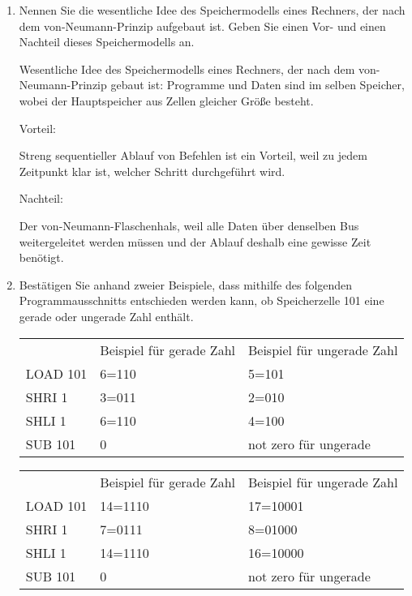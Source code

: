 \documentclass{lehramt-informatik-aufgabe}
\begin{document}
\begin{enumerate}

\item Nennen Sie die wesentliche Idee des Speichermodells eines
Rechners, der nach dem von-Neumann-Prinzip aufgebaut ist. Geben Sie
einen Vor- und einen Nachteil dieses Speichermodells an.

\begin{liAntwort}
Wesentliche Idee des Speichermodells eines Rechners, der nach dem
von-Neumann-Prinzip gebaut ist: Programme und Daten sind im selben
Speicher, wobei der Hauptspeicher aus Zellen gleicher Größe besteht.

Vorteil:

Streng sequentieller Ablauf von Befehlen ist ein Vorteil, weil zu jedem
Zeitpunkt klar ist, welcher Schritt durchgeführt wird.

Nachteil:

Der von-Neumann-Flaschenhals, weil alle Daten über denselben Bus
weitergeleitet werden müssen und der Ablauf deshalb eine gewisse Zeit
benötigt.
\end{liAntwort}


\item Bestätigen Sie anhand zweier Beispiele, dass mithilfe des
folgenden Programmausschnitts entschieden werden kann, ob
Speicherzelle 101 eine gerade oder ungerade Zahl enthält.

\begin{tabular}{lll}
         & Beispiel für gerade    Zahl & Beispiel für ungerade    Zahl \\
LOAD 101 & 6=110                       & 5=101                         \\
SHRI 1   & 3=011                       & 2=010                         \\
SHLI 1   & 6=110                       & 4=100                         \\
SUB 101  & 0                           & not zero    für ungerade
\end{tabular}

\begin{tabular}{lll}
         & Beispiel für gerade    Zahl & Beispiel für ungerade    Zahl \\
LOAD 101 & 14=1110                     & 17=10001                      \\
SHRI 1   & 7=0111                      & 8=01000                       \\
SHLI 1   & 14=1110                     & 16=10000                      \\
SUB 101  & 0                           & not zero    für ungerade
\end{tabular}


\end{enumerate}
\end{document}
